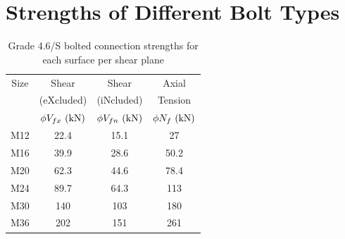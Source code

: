 \section{Strengths of Different Bolt Types}
\begin{table}[H]
\centering\footnotesize
\caption{Grade 4.6/S bolted connection strengths for each surface per shear plane}
\begin{tabular}{c|ccc}
	\toprule
	Size &           Shear           &           Shear           &          Axial           \\
	     &        (eXcluded)         &        (iNcluded)         &         Tension          \\
	     & $\phi{}V_{fx}~(\si{\kilo\newton})$ & $\phi{}V_{fn}~(\si{\kilo\newton})$ & $\phi{}N_{f}~(\si{\kilo\newton})$ \\ \midrule
	M12  &           22.4            &           15.1            &            27            \\
	M16  &           39.9            &           28.6            &           50.2           \\
	M20  &           62.3            &           44.6            &           78.4           \\
	M24  &           89.7            &           64.3            &           113            \\
	M30  &            140            &            103            &           180            \\
	M36  &            202            &            151            &           261            \\ \bottomrule
\end{tabular}
\end{table}
